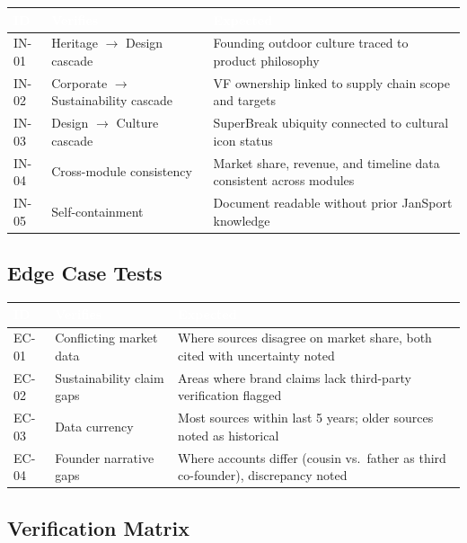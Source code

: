 \documentclass[11pt,letterpaper]{article}
\newcommand{\tableheader}[1]{\textbf{\sffamily\textcolor{white}{#1}}}
\begin{document}
\begin{center}
\begin{tabularx}{\textwidth}{C{1.2cm}L{3.5cm}X}
\toprule
{}
\tableheader{ID} & \tableheader{Verifies} & \tableheader{Expected} \\
\midrule
IN-01 & Heritage $\rightarrow$ Design cascade & Founding outdoor culture traced to product philosophy \\
IN-02 & Corporate $\rightarrow$ Sustainability cascade & VF ownership linked to supply chain scope and targets \\
IN-03 & Design $\rightarrow$ Culture cascade & SuperBreak ubiquity connected to cultural icon status \\
IN-04 & Cross-module consistency & Market share, revenue, and timeline data consistent across modules \\
IN-05 & Self-containment & Document readable without prior JanSport knowledge \\
\bottomrule
\end{tabularx}
\end{center}

\subsection{Edge Case Tests}

\begin{center}
\begin{tabularx}{\textwidth}{C{1.2cm}L{3.5cm}X}
\toprule
{}
\tableheader{ID} & \tableheader{Verifies} & \tableheader{Expected} \\
\midrule
EC-01 & Conflicting market data & Where sources disagree on market share, both cited with uncertainty noted \\
EC-02 & Sustainability claim gaps & Areas where brand claims lack third-party verification flagged \\
EC-03 & Data currency & Most sources within last 5 years; older sources noted as historical \\
EC-04 & Founder narrative gaps & Where accounts differ (cousin vs.\ father as third co-founder), discrepancy noted \\
\bottomrule
\end{tabularx}
\end{center}

\subsection{Verification Matrix}
\end{document}
